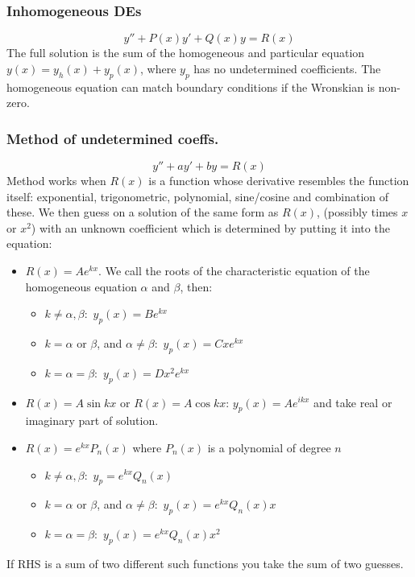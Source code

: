 \documentclass[a4paper, 10pt]{article}
\begin{document}
\begin{multicols*}{3}
\subsubsection*{Inhomogeneous DEs}
$$y'' + P(x)y' +Q(x)y = R(x)$$
The full solution is the sum of the homogeneous and particular equation $y(x)=y_{h}(x)+y_p(x)$, where $y_p$ has no undetermined coefficients. The homogeneous equation can match boundary conditions if the Wronskian is non-zero.

\subsubsection*{\small Method of undetermined coeffs.}
$$ y'' + ay' + by = R(x)$$
Method works when $R(x)$ is a function whose derivative resembles the function itself: exponential, trigonometric, polynomial, sine/cosine and combination of these. We then guess on a solution of the same form as $R(x)$, (possibly times $x$ or $x^2$) with an unknown coefficient which is determined by putting it into the equation:
\begin{itemize}
  \item $R(x) = Ae^{kx}$. We call the roots of the characteristic equation of the homogeneous equation $\alpha$ and $\beta$, then:
    \begin{itemize}
      \item $k\neq \alpha, \beta:$ $y_p(x) = Be^{kx}$
      \item $k=\alpha \text{ or } \beta$, and $\alpha\neq\beta:$ $y_p(x) = Cxe^{kx}$
      \item $k=\alpha=\beta:$ $y_p(x) = Dx^2e^{kx}$
    \end{itemize}
  \item $R(x) = A\sin{kx}$ or $R(x) = A\cos{kx}$: $y_p(x) = Ae^{ikx}$ and take real or imaginary part of solution.
  \item $R(x) = e^{kx} P_n(x)$ where $P_n(x)$ is a polynomial of degree $n$
  \begin{itemize}
    \item $k\neq \alpha, \beta:$ $y_p = e^{kx}Q_n(x)$
    \item $k=\alpha \text{ or } \beta$, and $\alpha\neq\beta:$ $y_p(x) = e^{kx}Q_n(x)x$
    \item $k=\alpha=\beta:$ $y_p(x) = e^{kx}Q_{n}(x)x^2$
  \end{itemize}
\end{itemize}
If RHS is a sum of two different such functions you take the sum of two guesses.


\end{multicols*}
\end{document}
